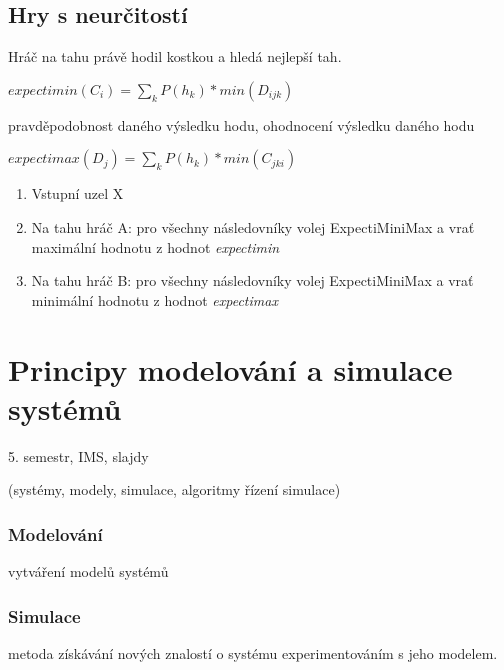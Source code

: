 \documentclass[a4wide]{report}
\begin{document}
\section{Hry s neurčitostí}

Hráč na tahu právě hodil kostkou a hledá nejlepší tah.

$expectimin(C_i) = \sum_k P( h_k) * min(D_{ijk})$

pravděpodobnost daného výsledku hodu, ohodnocení výsledku daného hodu

$expectimax(D_j) = \sum_k P( h_k) * min(C_{jki})$

\begin{enumerate}
	\item Vstupní uzel X
	\item Na tahu hráč A: pro všechny následovníky volej ExpectiMiniMax a vrať maximální hodnotu z hodnot \emph{expectimin}
	\item Na tahu hráč B: pro všechny následovníky volej ExpectiMiniMax a vrať minimální hodnotu z hodnot \emph{expectimax}
\end{enumerate}



























\chapter{Principy modelování a simulace systémů} \label{cha:25}

5. semestr, IMS, slajdy

(systémy, modely, simulace, algoritmy řízení simulace)

\subsection{Modelování}
vytváření modelů systémů

\subsection{Simulace} metoda získávání nových znalostí o systému experimentováním s jeho modelem.
\end{document}
